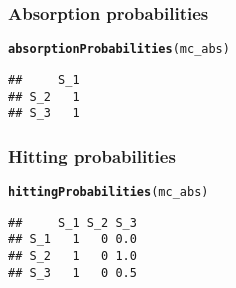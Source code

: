\documentclass[aspectratio=169]{beamer}\usepackage[]{graphicx}\usepackage[]{xcolor}
\makeatletter
\newcommand{\hldef}[1]{\textcolor[rgb]{0.345,0.345,0.345}{#1}}%
\newcommand{\hlkwd}[1]{\textcolor[rgb]{0.737,0.353,0.396}{\textbf{#1}}}%
\newenvironment{kframe}{%
 \def\at@end@of@kframe{}%
 \ifinner\ifhmode%
  \def\at@end@of@kframe{\end{minipage}}%
  \begin{minipage}{\columnwidth}%
 \fi\fi%
 \def\FrameCommand##1{\hskip\@totalleftmargin \hskip-\fboxsep
 \colorbox{shadecolor}{##1}\hskip-\fboxsep
     \hskip-\linewidth \hskip-\@totalleftmargin \hskip\columnwidth}%
 \MakeFramed {\advance\hsize-\width
   \@totalleftmargin\z@ \linewidth\hsize
   \@setminipage}}%
 {\par\unskip\endMakeFramed%
 \at@end@of@kframe}
\newenvironment{knitrout}{}{} %
\makeatother
\begin{document}
\begin{frame}[fragile]\frametitle{Absorption probabilities}
\begin{knitrout}
\color{fgcolor}\begin{kframe}
\begin{alltt}
\hlkwd{absorptionProbabilities}\hldef{(mc_abs)}
\end{alltt}
\begin{verbatim}
##     S_1
## S_2   1
## S_3   1
\end{verbatim}
\end{kframe}
\end{knitrout}
\end{frame}

\begin{frame}[fragile]\frametitle{Hitting probabilities}
\begin{knitrout}
\color{fgcolor}\begin{kframe}
\begin{alltt}
\hlkwd{hittingProbabilities}\hldef{(mc_abs)}
\end{alltt}
\begin{verbatim}
##     S_1 S_2 S_3
## S_1   1   0 0.0
## S_2   1   0 1.0
## S_3   1   0 0.5
\end{verbatim}
\end{kframe}
\end{knitrout}
\end{frame}

  
\end{document}
